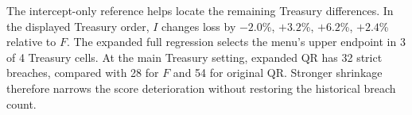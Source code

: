 

The intercept-only reference helps locate the remaining Treasury differences. In the displayed Treasury order, $I$ changes loss by $-2.0$\%, $+3.2$\%, $+6.2$\%, $+2.4$\% relative to $F$. The expanded full regression selects the menu's upper endpoint in 3 of 4 Treasury cells. At the main Treasury setting, expanded QR has 32 strict breaches, compared with 28 for $F$ and 54 for original QR. Stronger shrinkage therefore narrows the score deterioration without restoring the historical breach count.
